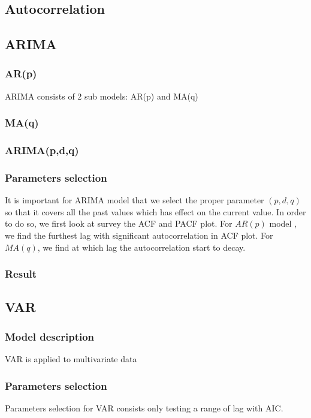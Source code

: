 \documentclass[12pt]{article}
\begin{document}
\subsection{Autocorrelation}

\subsection{ARIMA}
\subsubsection{AR(p)}
ARIMA consists of 2 sub models: AR(p) and MA(q)

\subsubsection{MA(q)}

\subsubsection{ARIMA(p,d,q)}

\subsubsection{Parameters selection}
It is important for ARIMA model that we select the proper parameter $(p, d, q)$
so that it covers all the past values which has effect on the current value. In
order to do so, we first look at survey the ACF and PACF plot. For $AR(p)$ model
, we find the furthest lag with significant autocorrelation in ACF plot. For
$MA(q)$, we find at which lag the autocorrelation start to decay.



\subsubsection{Result}

\subsection{VAR}
\subsubsection{Model description}
VAR is applied to multivariate data
\subsubsection{Parameters selection}
Parameters selection for VAR consists only testing a range of lag with AIC. 
\end{document}
